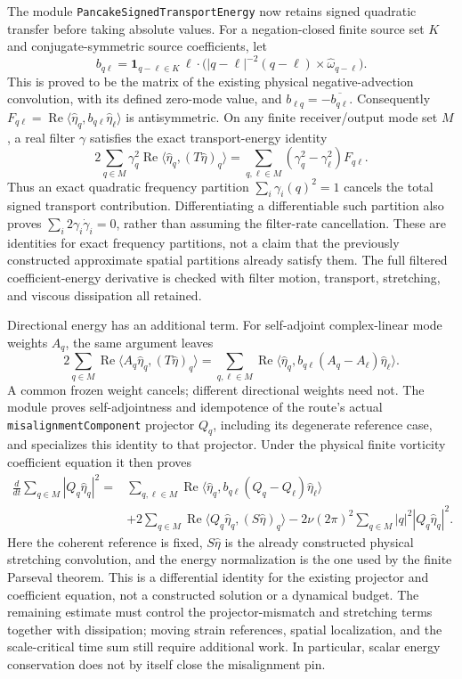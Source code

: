 \documentclass[11pt]{article}
\theoremstyle{definition}
\begin{document}
The module \texttt{PancakeSignedTransportEnergy} now retains signed
quadratic transfer before taking absolute values.  For a negation-closed
finite source set $K$ and conjugate-symmetric source coefficients, let
\[
 b_{q\ell}=\mathbf1_{q-\ell\in K}\,
   \ell\cdot\bigl(|q-\ell|^{-2}(q-\ell)\times
     \widehat\omega_{q-\ell}\bigr).
\]
This is proved to be the matrix of the existing physical negative-advection
convolution, with its defined zero-mode value, and
$b_{\ell q}=-\overline{b_{q\ell}}$.  Consequently
$F_{q\ell}=\operatorname{Re}\langle\widehat\eta_q,
b_{q\ell}\widehat\eta_\ell\rangle$ is antisymmetric.  On any finite
receiver/output mode set $M$, a real filter $\gamma$ satisfies the exact
transport-energy identity
\[
 2\sum_{q\in M}\gamma_q^2
   \operatorname{Re}\langle\widehat\eta_q,(T\widehat\eta)_q\rangle
 =\sum_{q,\ell\in M}(\gamma_q^2-\gamma_\ell^2)F_{q\ell}.
\]
Thus an exact quadratic frequency partition $\sum_i\gamma_i(q)^2=1$
cancels the total signed transport contribution.  Differentiating a
differentiable such partition also proves
$\sum_i2\gamma_i\dot\gamma_i=0$, rather than assuming the filter-rate
cancellation.  These are identities for exact frequency partitions, not a
claim that the previously constructed approximate spatial partitions already
satisfy them.  The full filtered coefficient-energy derivative is checked
with filter motion, transport, stretching, and viscous dissipation all retained.

Directional energy has an additional term.  For self-adjoint
complex-linear mode weights $A_q$, the same argument leaves
\[
 2\sum_{q\in M}\operatorname{Re}
   \langle A_q\widehat\eta_q,(T\widehat\eta)_q\rangle
 =\sum_{q,\ell\in M}\operatorname{Re}
   \langle\widehat\eta_q,b_{q\ell}(A_q-A_\ell)
       \widehat\eta_\ell\rangle.
\]
A common frozen weight cancels; different directional weights need not.
The module proves self-adjointness and idempotence of the route's actual
\texttt{misalignmentComponent} projector $Q_q$, including its degenerate
reference case, and specializes this identity to that projector.  Under
the physical finite vorticity coefficient equation it then proves
\begin{align*}
 \frac{d}{dt}\sum_{q\in M}|Q_q\widehat\eta_q|^2
 ={}&\sum_{q,\ell\in M}\operatorname{Re}
       \langle\widehat\eta_q,b_{q\ell}(Q_q-Q_\ell)
          \widehat\eta_\ell\rangle\\
 &+2\sum_{q\in M}\operatorname{Re}
       \langle Q_q\widehat\eta_q,(S\widehat\eta)_q\rangle
   -2\nu(2\pi)^2\sum_{q\in M}|q|^2|Q_q\widehat\eta_q|^2.
\end{align*}
Here the coherent reference is fixed, $S\widehat\eta$ is the already
constructed physical stretching convolution, and the energy normalization
is the one used by the finite Parseval theorem.  This is a differential
identity for the existing projector and coefficient equation, not a
constructed solution or a dynamical budget.  The remaining estimate must
control the projector-mismatch and stretching terms together with
dissipation; moving strain references, spatial localization, and the
scale-critical time sum still require additional work.  In particular,
scalar energy conservation does not by itself close the misalignment pin.
\end{document}
